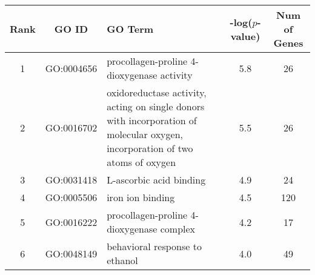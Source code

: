 \centering \begin{tabular}{c|c|p{4in}|c|c}
Rank	&GO ID	&GO Term	&-log($p$-value)	&Num of Genes\\\hline
1	&GO:0004656	&procollagen-proline 4-dioxygenase activity	&5.8	&26\\
2	&GO:0016702	&oxidoreductase activity, acting on single donors with incorporation of molecular oxygen, incorporation of two atoms of oxygen	&5.5	&26\\
3	&GO:0031418	&L-ascorbic acid binding	&4.9	&24\\
4	&GO:0005506	&iron ion binding	&4.5	&120\\
5	&GO:0016222	&procollagen-proline 4-dioxygenase complex	&4.2	&17\\
6	&GO:0048149	&behavioral response to ethanol	&4.0	&49\\
\end{tabular}
